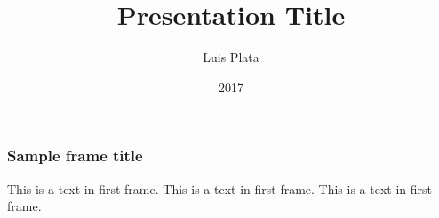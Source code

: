 \documentclass{beamer}
\title{Presentation Title}
\author{Luis Plata}
\institute{Tecnologico de Monterrey}
\date{2017}
\begin{document}
 
\frame{\titlepage}
 
\begin{frame}
\frametitle{Sample frame title}
This is a text in first frame. This is a text in first frame. This is a text in first frame.
\end{frame}
 
\end{document}
